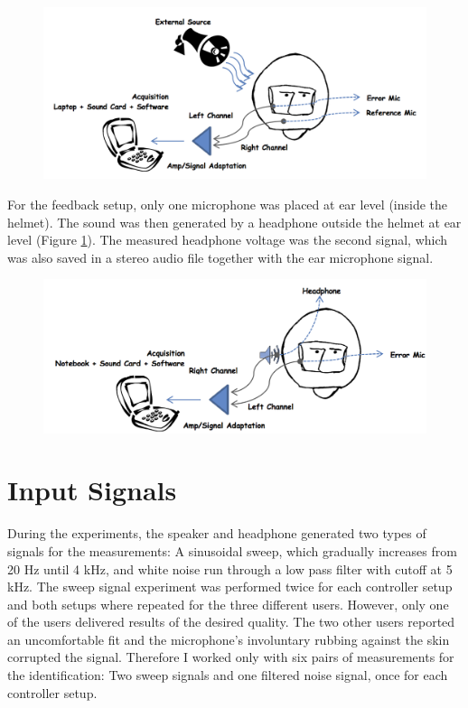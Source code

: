 \begin{figure}[H]
\centering
\includegraphics[width=1.0\textwidth]{pics/setupff}
\caption{}
\label{pic:}
\end{figure}

For the feedback setup, only one microphone was placed at ear level (inside the helmet). The sound was then generated by a headphone outside the helmet at ear level (Figure \ref{}). The measured headphone voltage was the second signal, which was also saved in a stereo audio file together with the ear microphone signal.

\begin{figure}[H]
\centering
\includegraphics[width=1.0\textwidth]{pics/setupfb}
\caption{}
\label{pic:}
\end{figure}

\section{Input Signals}

During the experiments, the speaker and headphone generated two types of signals for the measurements: A sinusoidal sweep, which gradually increases from 20 Hz until 4 kHz, and white noise run through a low pass filter with cutoff at 5 kHz. The sweep signal experiment was performed twice for each controller setup and both setups where repeated for the three different users. However, only one of the users delivered results of the desired quality. The two other users reported an uncomfortable fit and the microphone's involuntary rubbing against the skin corrupted the signal. Therefore I worked only with six pairs of measurements for the identification: Two sweep signals and one filtered noise signal, once for each controller setup.


